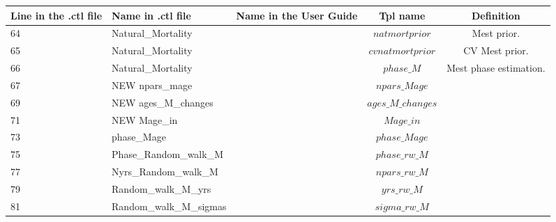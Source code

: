 \documentclass{article}
\begin{document}
\begin{tabular}{| p{0.9cm} | p{4.0cm}  | p{1.9cm} | c | c |}
\hline
Line in the .ctl file & Name in .ctl file  & Name in the User Guide & Tpl name & Definition\\ \hline
64 &  Natural\_Mortality  &   & $natmortprior$ & Mest prior.
\\ \hline
65 &  Natural\_Mortality  &   & $cvnatmortprior$ & CV Mest prior.\\ \hline
66 &  Natural\_Mortality  &   & $phase\_M$  & Mest phase estimation.\\ \hline
67 &  NEW npars\_mage  &   & $npars\_Mage$ & \\ \hline
69 &  NEW ages\_M\_changes  &   & $ages\_M\_changes$ &\\ \hline
71 &  NEW Mage\_in  &   & $Mage\_in$  &\\ \hline
73 &  phase\_Mage  &   &  $phase\_Mage$ &\\ \hline
75 &  Phase\_Random\_walk\_M	  &   & $phase\_rw\_M$ &\\ \hline
77 &  Nyrs\_Random\_walk\_M  &   & $npars\_rw\_M$ &\\ \hline
79 &  Random\_walk\_M\_yrs	  &   & $yrs\_rw\_M$ &\\ \hline
81 &  Random\_walk\_M\_sigmas  &   & $sigma\_rw\_M$  &\\ \hline


\end{tabular}
\end{document}
